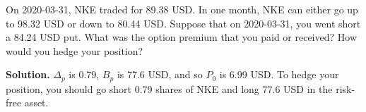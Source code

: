 \noindent On 2020-03-31, NKE traded for 89.38 USD. In one month, NKE can either go up to 98.32 USD or down to 80.44 USD. Suppose that on 2020-03-31, you went short a 84.24 USD put. What was the option premium that you paid or received? How would you hedge your position?

\vspace{9pt}

\noindent\textbf{Solution.} $\Delta_{p}$ is 0.79, $B_{p}$ is 77.6 USD, and so $P_{0}$ is 6.99 USD. To hedge your position, you should go short 0.79 shares of NKE and long 77.6 USD in the risk-free asset.